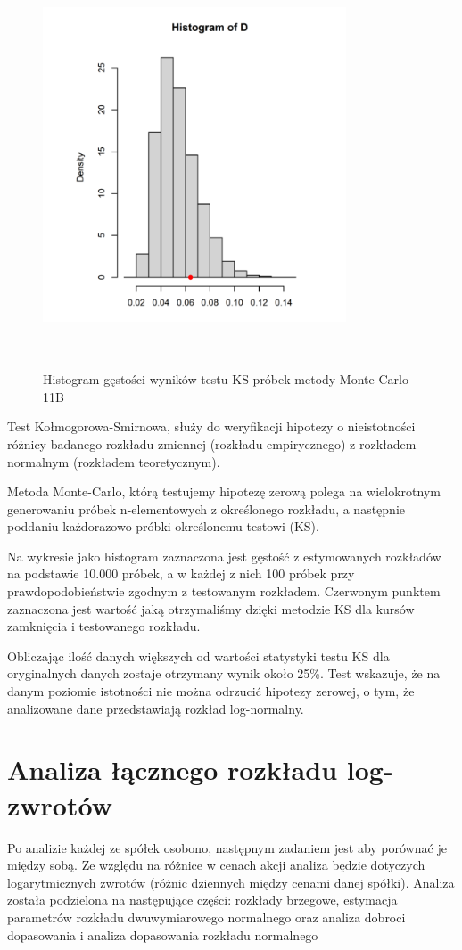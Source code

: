 \documentclass[a4paper,11pt]{article}
\begin{document}
\begin{figure}[h]
\centering
\includegraphics[width=9cm, height=12cm]{img/Histogram_of_D_11B.png}
\caption{ Histogram gęstości wyników testu KS próbek metody Monte-Carlo - 11B}
\end{figure}
Test Kołmogorowa-Smirnowa, służy do weryfikacji hipotezy o nieistotności różnicy badanego rozkładu zmiennej (rozkładu empirycznego) z rozkładem normalnym (rozkładem teoretycznym).

Metoda Monte-Carlo, którą testujemy hipotezę zerową polega na wielokrotnym generowaniu próbek n-elementowych z określonego rozkładu, a następnie poddaniu każdorazowo próbki określonemu testowi (KS).

Na wykresie jako histogram zaznaczona jest gęstość z estymowanych rozkładów na podstawie 10.000 próbek, a w każdej z nich 100 próbek przy prawdopodobieństwie zgodnym z testowanym rozkładem. Czerwonym punktem zaznaczona jest wartość jaką otrzymaliśmy dzięki metodzie KS dla kursów zamknięcia i testowanego rozkładu.

Obliczając ilość danych większych od wartości statystyki testu KS dla oryginalnych danych zostaje otrzymany wynik około 25\%. Test wskazuje, że na danym poziomie istotności nie można odrzucić hipotezy zerowej, o tym, że analizowane dane przedstawiają rozkład log-normalny.


\newpage
\section{Analiza łącznego rozkładu log-zwrotów}
Po analizie każdej ze spółek osobono, następnym zadaniem jest aby porównać je między sobą. Ze względu na różnice w cenach akcji analiza będzie dotyczych logarytmicznych zwrotów (różnic dziennych między cenami danej spółki). Analiza została podzielona na następujące części: rozkłady brzegowe, estymacja parametrów rozkładu dwuwymiarowego normalnego oraz analiza dobroci dopasowania i analiza dopasowania rozkładu normalnego
\end{document}
